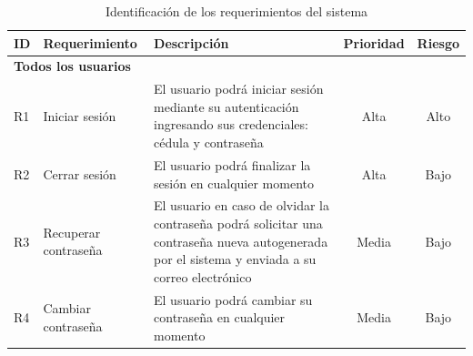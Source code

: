 \begin{spacing}{1}

    \begin{center}
        \renewcommand*{\arraystretch}{1.4}
        \begin{longtable}[l]{|p{}|p{}|p{}|p{}| p{}|}
            \caption{Identificación de los requerimientos del sistema} \\
            \hline
            \textbf{ID} & \textbf{Requerimiento}                            & \textbf{Descripción}                                                                                                                                                                                                                                                                                                                                                                                                                                                                   & \textbf{Prioridad}         & \textbf{Riesgo}           \\
            \hline
            \multicolumn{5}{|l|}{ \textbf{Todos los usuarios} } \\
            \hline
            R1          & Iniciar sesión                                    & El usuario podrá iniciar sesión mediante su autenticación ingresando sus credenciales: cédula y contraseña & \multicolumn{1}{c|}{Alta} & \multicolumn{1}{c|}{Alto}\\
            \hline
            R2          & Cerrar sesión                                     & El usuario podrá finalizar la sesión en cualquier momento                                                                                                                                                                                                                                                                                                                                                                                                                              & \multicolumn{1}{c|}{Alta} & \multicolumn{1}{c|}{Bajo}\\
            \hline
            R3          & Recuperar contraseña                              & El usuario en caso de olvidar la contraseña podrá solicitar una contraseña nueva autogenerada por el sistema y enviada a su correo electrónico & \multicolumn{1}{c|}{Media} & \multicolumn{1}{c|}{Bajo}\\
            \hline
            R4          & Cambiar contraseña                                & El usuario podrá cambiar su contraseña en cualquier momento & \multicolumn{1}{c|}{Media} & \multicolumn{1}{c|}{Bajo}\\

\end{longtable}
\end{center}
\end{spacing}
